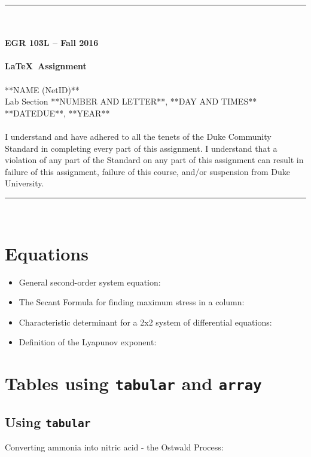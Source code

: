 \documentclass{article}
\begin{document}
\begin{center}
\rule{6.5in}{0.5mm}\\~\\
{\bf \large EGR 103L -- Fall 2016}\\~\\
{\huge \bf \LaTeX~Assignment}\\~\\
**NAME (NetID)**\\
Lab Section **NUMBER AND LETTER**, **DAY AND TIMES**\\
**DATEDUE**, **YEAR**\\~\\ 
{\small I understand and have adhered to all the tenets of the Duke
  Community Standard in completing every part of this assignment.  I
  understand that a violation of any part of the Standard on any part
  of this assignment can result in failure of this assignment, failure
  of this course, and/or suspension from Duke University.} 
\rule{6.5in}{0.5mm}\\
\end{center}
\tableofcontents
\listoffigures
\pagebreak

\section{Equations} %
\begin{itemize}
\item General second-order system equation\cite[p.~221]{Rizzoni}:
\item The Secant Formula for finding maximum stress 
in a column\cite[p.~681]{Hibbeler}:
\item Characteristic determinant for a 2x2 system of 
differential equations\cite[p.~152]{Kreyszig}:
\item Definition of the Lyapunov exponent\cite[p.~56]{Ott}:
\end{itemize}

\section{Tables using {\tt tabular} and {\tt array}}
\subsection{Using {\tt tabular}} %
Converting ammonia into nitric acid - the Ostwald Process\cite{Ostwald}:
\end{document}
